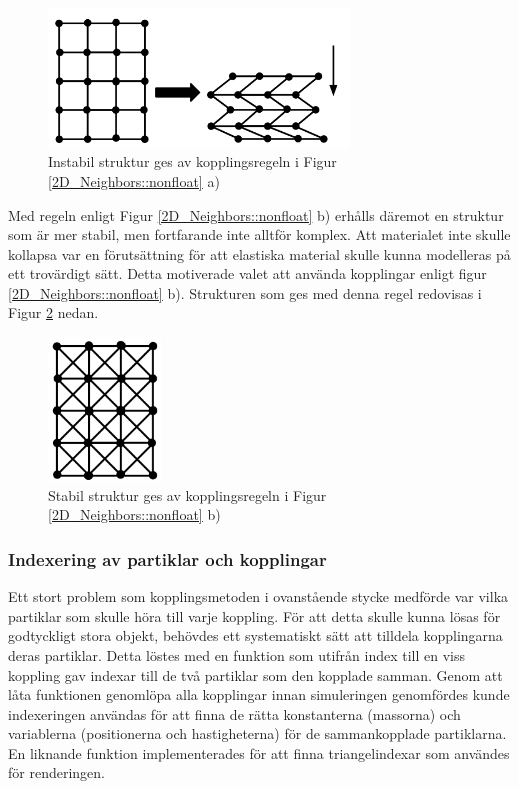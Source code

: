 \documentclass[a4paper,12pt,oneside,final,swedish]{extarticle}
\begin{document}
\begin{figure}[h!]
  \begin{center}
    \includegraphics[width=8cm]{Bilder/2D_Instabil.png} 
  \end{center}
  \caption{Instabil struktur ges av kopplingsregeln i Figur \ref{2D_Neighbors::nonfloat} a) }
  \label{2D_Instabil::nonfloat}
\end{figure}

\noindent Med regeln enligt Figur \ref{2D_Neighbors::nonfloat} b) erhålls däremot en struktur som är mer stabil, men fortfarande inte alltför komplex. Att materialet inte skulle kollapsa var en förutsättning för att elastiska material skulle kunna modelleras på ett trovärdigt sätt. Detta motiverade valet att använda kopplingar enligt figur \ref{2D_Neighbors::nonfloat} b). Strukturen som ges med denna regel redovisas i Figur \ref{2D_stabil::nonfloat} nedan.

\begin{figure}[h!]
  \begin{center}
    \includegraphics[width=3cm]{Bilder/2D_stabil.png} 
  \end{center}
  \caption{Stabil struktur ges av kopplingsregeln i Figur \ref{2D_Neighbors::nonfloat} b)}
  \label{2D_stabil::nonfloat}
\end{figure}

\subsubsection{Indexering av partiklar och kopplingar}
Ett stort problem som kopplingsmetoden i ovanstående stycke medförde var vilka partiklar som skulle höra till varje koppling. För att detta skulle kunna lösas för godtyckligt stora objekt, behövdes ett systematiskt sätt att tilldela kopplingarna deras partiklar. Detta löstes med en funktion som utifrån index till en viss koppling gav indexar till de två partiklar som den kopplade samman. Genom att låta funktionen genomlöpa alla kopplingar innan simuleringen genomfördes kunde indexeringen användas för att finna de rätta konstanterna (massorna) och variablerna (positionerna och hastigheterna) för de sammankopplade partiklarna. En liknande funktion implementerades för att finna triangelindexar som användes för renderingen.
\end{document}
